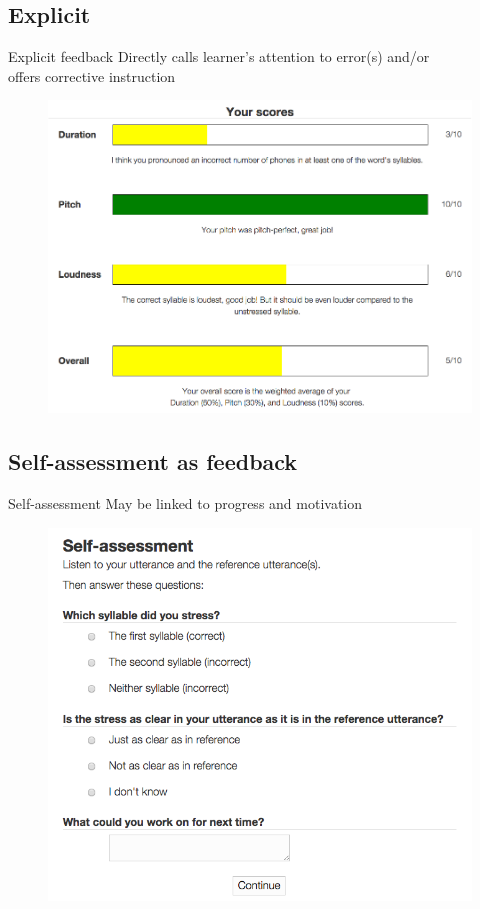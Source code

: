 \documentclass[xcolor={dvipsnames}]{beamer}
\begin{document}
	\subsection{Explicit}
		\begin{frame}{Explicit feedback}
		Directly calls learner's attention to error(s) and/or \\offers corrective instruction
		
		\begin{figure}
		\includegraphics[height=.8\textheight]{SkillBarsWithMessages}
		\end{figure}
		\end{frame}
		
		
	\subsection{Self-assessment as feedback}
		\begin{frame}{Self-assessment}
		May be linked to progress and motivation
		
		\begin{figure}
		\includegraphics[height=0.7\textheight]{selfAssessment}
		\end{figure}
		\end{frame}
\end{document}
